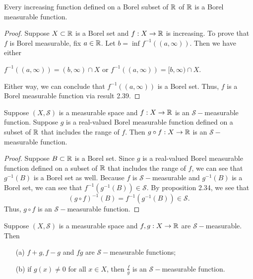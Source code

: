 \documentclass[11pt,a4paper]{book}
\begin{document}
\begin{prop}
   Every increasing function defined on a Borel subset of \( \mathbb{R}  \) of \( \mathbb{R}  \) is a Borel measurable function. 
\end{prop}
\begin{proof}
    Suppose \( X \subset \mathbb{R}  \) is a Borel set and \( f: X \to \mathbb{R}  \) is increasing. To prove that \( f  \) is Borel measurable, fix \( a \in \mathbb{R}  \). 
    Let \( b = \inf f^{-1}((a,\infty )) \). Then we have either
    \begin{center}
        \( f^{-1}((a,\infty )) = (b,\infty  ) \cap X  \) or \( f^{-1}((a,\infty )) = [b,\infty ) \cap X  \).
    \end{center}
    Either way, we can conclude that \( f^{-1}((a,\infty)) \) is a Borel set. Thus, \( f \) is a Borel measurable function via result 2.39.
\end{proof}

\begin{prop}
   Suppose \( (X,\mathcal{S}) \) is a measurable space and \( f: X \to \mathbb{R}  \) is an \( \mathcal{S}- \)measurable function. Suppose \( g  \) is a real-valued Borel measurable function defined on a subset of \( \mathbb{R}  \) that includes the range of \( f  \). Then \( g \circ f : X \to \mathbb{R}  \) is an \( \mathcal{S}- \)measurable function.
\end{prop}
\begin{proof}
Suppose \( B \subset \mathbb{R}  \) is a Borel set. Since \( g  \) is a real-valued Borel measurable function defined on a subset of \( \mathbb{R}  \) that includes the range of \( f  \), we can see that \( g^{-1}(B)  \) is a Borel set as well. Because \( f  \) is \( \mathcal{S}- \)measurable and \( g^{-1}(B)  \) is a Borel set, we can see that \( f^{-1}(g^{-1}(B)) \in \mathcal{S} \). By proposition 2.34, we see that 
\[  (g \circ f)^{-1}(B) = f^{-1}(g^{-1}(B)) \in \mathcal{S}. \]
Thus, \( g \circ f  \) is an \( \mathcal{S}- \)measurable function.
\end{proof}

\begin{prop}
    Suppose \( (X, \mathcal{S}) \) is a measurable space and \( f,g : X \to \mathbb{R}  \) are \( \mathcal{S}-  \)measurable. Then  
    \begin{enumerate}
        \item[(a)] \( f  + g , f - g  \) and \( fg  \) are \( \mathcal{S}- \)measurable functions;
        \item[(b)] if \( g(x) \neq 0  \) for all \( x \in X  \), then \( \frac{ f  }{ g  }   \) is an \( \mathcal{S}- \)measurable function.
    \end{enumerate}
\end{prop}
\end{document}
